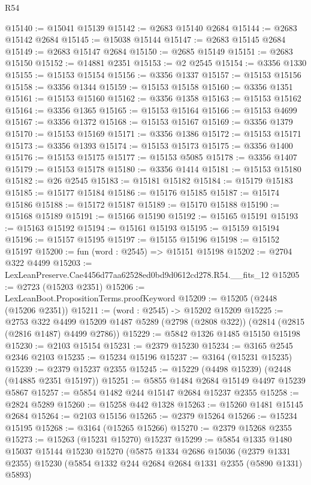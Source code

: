 \begin{lexlean}{R54}
\begin{coremodule}
@15140 := @15041 @15139
@15142 := @2683 @15140 @2684
@15144 := @2683 @15142 @2684
@15145 := @15038 @15144
@15147 := @2683 @15145 @2684
@15149 := @2683 @15147 @2684
@15150 := @2685 @15149
@15151 := @2683 @15150
@15152 := @14881 @2351
@15153 := @2 @2545
@15154 := @3356 @1330
@15155 := @15153 @15154
@15156 := @3356 @1337
@15157 := @15153 @15156
@15158 := @3356 @1344
@15159 := @15153 @15158
@15160 := @3356 @1351
@15161 := @15153 @15160
@15162 := @3356 @1358
@15163 := @15153 @15162
@15164 := @3356 @1365
@15165 := @15153 @15164
@15166 := @15153 @4699
@15167 := @3356 @1372
@15168 := @15153 @15167
@15169 := @3356 @1379
@15170 := @15153 @15169
@15171 := @3356 @1386
@15172 := @15153 @15171
@15173 := @3356 @1393
@15174 := @15153 @15173
@15175 := @3356 @1400
@15176 := @15153 @15175
@15177 := @15153 @5085
@15178 := @3356 @1407
@15179 := @15153 @15178
@15180 := @3356 @1414
@15181 := @15153 @15180
@15182 := @26 @2545
@15183 := @15181 @15182
@15184 := @15179 @15183
@15185 := @15177 @15184
@15186 := @15176 @15185
@15187 := @15174 @15186
@15188 := @15172 @15187
@15189 := @15170 @15188
@15190 := @15168 @15189
@15191 := @15166 @15190
@15192 := @15165 @15191
@15193 := @15163 @15192
@15194 := @15161 @15193
@15195 := @15159 @15194
@15196 := @15157 @15195
@15197 := @15155 @15196
@15198 := @15152 @15197
@15200 := fun (word : @2545) => @15151 @15198
@15202 := @2704 @322 @4499
@15203 := LexLeanPreserve.Cae4456d77aa62528ed0bd9d0612cd278.R54.__fits_12
@15205 := @2723 (@15203 @2351)
@15206 := LexLeanBoot.PropositionTerms.proofKeyword
@15209 := @15205 (@2448 (@15206 @2351))
@15211 := (word : @2545) -> @15202 @15209
@15225 := @2753
    @322
    @4499
    @15209
    @1487
    @5289
    (@2798 (@2808 @322))
    (@2814 (@2815 (@2816 @1487) @4499 @2786))
@15229 := @5842 @1326 @1485 @15150 @15198
@15230 := @2103 @15154
@15231 := @2379 @15230
@15234 := @3165 @2545 @2346 @2103
@15235 := @15234 @15196
@15237 := @3164 (@15231 @15235)
@15239 := @2379 @15237 @2355
@15245 := @15229 (@4498 @15239) (@2448 (@14885 @2351 @15197))
@15251 := @5855 @1484 @2684 @15149 @4497 @15239 @5867
@15257 := @5854 @1482 @244 @15147 @2684 @15237 @2355
@15258 := @2824 @5289
@15260 := @15258 @442 @1328
@15263 := @15260 @1481 @15145 @2684
@15264 := @2103 @15156
@15265 := @2379 @15264
@15266 := @15234 @15195
@15268 := @3164 (@15265 @15266)
@15270 := @2379 @15268 @2355
@15273 := @15263 (@15231 @15270) @15237
@15299 := @5854
    @1335
    @1480
    @15037
    @15144
    @15230
    @15270
    (@5875
      @1334
      @2686
      @15036
      (@2379 @1331 @2355)
      @15230
      (@5854 @1332 @244 @2684 @2684 @1331 @2355 (@5890 @1331) @5893)

\end{coremodule}
\end{lexlean}
